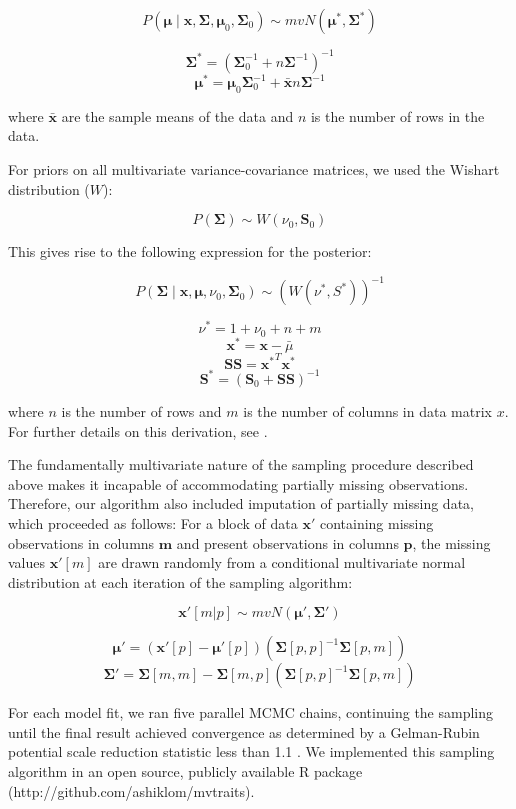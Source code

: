 $$P(\mathbf{\mu} \mid 
    \mathbf{x}, \mathbf{\Sigma}, 
    \mathbf{\mu}_0, \mathbf{\Sigma}_0)
  \sim
  mvN(\mathbf{\mu^*}, \mathbf{\Sigma^*})$$

$$\mathbf{\Sigma^*} = (\mathbf{\Sigma}_0^{-1} + n \mathbf{\Sigma}^{-1})^{-1}$$
$$\mathbf{\mu^*} = \mathbf{\mu}_0 \mathbf{\Sigma}_0^{-1} + \bar{\mathbf{x}} n \mathbf{\Sigma}^{-1}$$

where ${\bar{{\mathbf{x}}}}$ are the sample means of the data and $n$ is the number of rows in the data.

For priors on all multivariate variance-covariance matrices, we used the Wishart distribution ($W$):

$$P(\mathbf{\Sigma}) \sim W(\nu_0, \mathbf{S}_0)$$

This gives rise to the following expression for the posterior:

$$P(\mathbf{\Sigma} \mid
  \mathbf{x}, \mathbf{\mu},
  \nu_0, \mathbf{\Sigma}_0)
  \sim
  (W(\nu^*, S^*))^{-1}$$

$$\nu^* = 1 + \nu_0 + n + m$$
$$\mathbf{x^*} = \mathbf{x} - \bar{\mu}$$
$$\mathbf{SS} = \mathbf{x^*}^{T} \mathbf{x^*}$$
$$\mathbf{S^*} = (\mathbf{S}_0 + \mathbf{SS})^{-1}$$

where $n$ is the number of rows and $m$ is the number of columns in data matrix $x$. For further details on this derivation, see \cite{gelman_bayesian}. %

The fundamentally multivariate nature of the sampling procedure described above makes it incapable of accommodating partially missing observations.
Therefore, our algorithm also included imputation of partially missing data, which proceeded as follows:
For a block of data $\mathbf{x'}$ containing missing observations in columns $\mathbf{m}$ and present observations in columns $\mathbf{p}$,
the missing values $\mathbf{x'}[m]$ are drawn randomly from a conditional multivariate normal distribution at each iteration of the sampling algorithm:

$$\mathbf{x'}[m|p] \sim mvN(\mathbf{\mu}', \mathbf{\Sigma}')$$

$$\mathbf{\mu'} = 
  (\mathbf{x'}[p] - \mathbf{\mu'}[p]) 
  (\mathbf{\Sigma}[p,p]^{-1} \mathbf{\Sigma}[p,m])$$
$$\mathbf{\Sigma'} = \mathbf{\Sigma}[m,m] - 
  \mathbf{\Sigma}[m,p]
  (\mathbf{\Sigma}[p,p]^{-1} \mathbf{\Sigma}[p,m])$$

For each model fit, we ran five parallel MCMC chains, continuing the sampling until the final result achieved convergence as determined by a Gelman-Rubin potential scale reduction statistic less than 1.1 \cite{gelman_1992_inference}.
We implemented this sampling algorithm in an open source, publicly available R \cite[version 3.4.3]{rstats} package (http://github.com/ashiklom/mvtraits).



